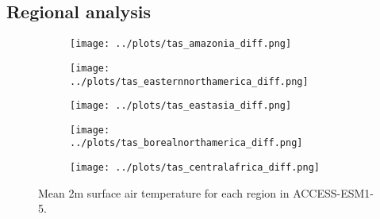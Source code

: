 \documentclass[]{article}
\begin{document}
\subsection{Regional analysis}

\begin{figure}[H]
    \centering
    \begin{subfigure}[b]{0.4\linewidth}
        \texttt{[image: ../plots/tas\_amazonia\_diff.png]}
    \end{subfigure}
    \begin{subfigure}[b]{0.4\linewidth}
        \texttt{[image: ../plots/tas\_easternnorthamerica\_diff.png]}
    \end{subfigure}
    \begin{subfigure}[b]{0.4\linewidth}
        \texttt{[image: ../plots/tas\_eastasia\_diff.png]}
    \end{subfigure}
    \begin{subfigure}[b]{0.4\linewidth}
        \texttt{[image: ../plots/tas\_borealnorthamerica\_diff.png]}
    \end{subfigure}
    \begin{subfigure}[b]{0.4\linewidth}
        \texttt{[image: ../plots/tas\_centralafrica\_diff.png]}
    \end{subfigure}
    \caption{Mean 2m surface air temperature for each region in ACCESS-ESM1-5.}
    \label{fig:ACCESS_tas_regions}
\end{figure}
\end{document}
